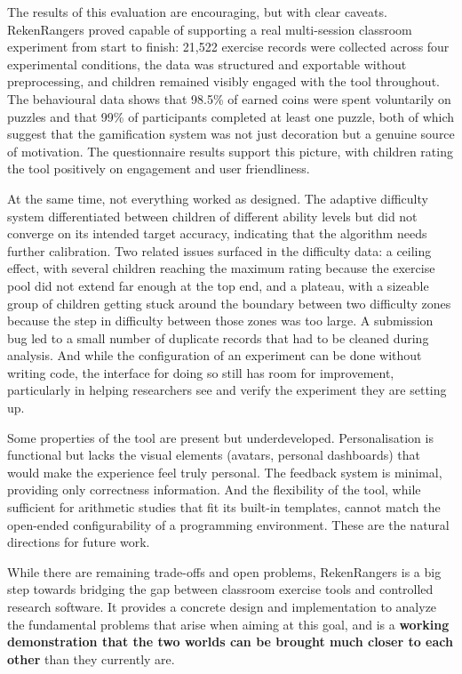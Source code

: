 The results of this evaluation are encouraging, but with clear caveats. RekenRangers proved capable of supporting a real multi-session classroom experiment from start to finish: 21,522 exercise records were collected across four experimental conditions, the data was structured and exportable without preprocessing, and children remained visibly engaged with the tool throughout. The behavioural data shows that 98.5\% of earned coins were spent voluntarily on puzzles and that 99\% of participants completed at least one puzzle, both of which suggest that the gamification system was not just decoration but a genuine source of motivation. The questionnaire results support this picture, with children rating the tool positively on engagement and user friendliness.

At the same time, not everything worked as designed. The adaptive difficulty system differentiated between children of different ability levels but did not converge on its intended target accuracy, indicating that the algorithm needs further calibration. Two related issues surfaced in the difficulty data: a ceiling effect, with several children reaching the maximum rating because the exercise pool did not extend far enough at the top end, and a plateau, with a sizeable group of children getting stuck around the boundary between two difficulty zones because the step in difficulty between those zones was too large. A submission bug led to a small number of duplicate records that had to be cleaned during analysis. And while the configuration of an experiment can be done without writing code, the interface for doing so still has room for improvement, particularly in helping researchers see and verify the experiment they are setting up.

Some properties of the tool are present but underdeveloped. Personalisation is functional but lacks the visual elements (avatars, personal dashboards) that would make the experience feel truly personal. The feedback system is minimal, providing only correctness information. And the flexibility of the tool, while sufficient for arithmetic studies that fit its built-in templates, cannot match the open-ended configurability of a programming environment. These are the natural directions for future work.

While there are remaining trade-offs and open problems, RekenRangers is a big step towards bridging the gap between classroom exercise tools and controlled research software. It provides a concrete design and implementation to analyze the fundamental problems that arise when aiming at this goal, and is a \textbf{working demonstration that the two worlds can be brought much closer to each other} than they currently are.

